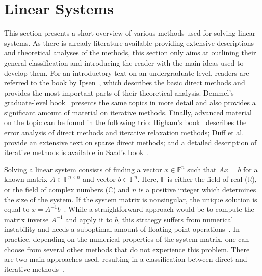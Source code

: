 \section{Linear Systems}

This section presents a short overview of various methods used for solving
linear systems. As there is already literature available providing extensive
descriptions and theoretical analyses of the methods, this section only aims at
outlining their general classification and introducing the reader with the main
ideas used to develop them. For an introductory text on an undergraduate level,
readers are referred to the book by Ipsen~\cite{Ipsen2009}, which describes the
basic direct methods and provides the most important parts of their theoretical
analysis. Demmel's graduate-level book~\cite{demmel} presents the same topics in
more detail and also provides a significant amount of material on iterative
methods. Finally, advanced material on the topic can be found in the following
trio: Higham's book~\cite{higham} describes the error analysis of direct methods
and iterative relaxation methods; Duff et al.~\cite{duff} provide an extensive
text on sparse direct methods; and a detailed description of iterative
methods is available in Saad's book~\cite{saad}.

Solving a linear system consists of finding a vector $x \in \mathbb{F}^n$ such
that $Ax = b$ for a known matrix $A \in \mathbb{F}^{n \times n}$ and vector $b
\in \mathbb{F}^n$. Here, $\mathbb{F}$ is either the field of real
($\mathbb{R}$), or the field of complex numbers ($\mathbb{C}$) and $n$ is a
positive integer which determines the size of the system. If the system matrix
is nonsingular, the unique solution is equal to $x = A^{-1}b$~\cite{demmel}.
While a straightforward approach would be to compute the matrix inverse $A^{-1}$
and apply it to $b$, this strategy suffers from numerical instability and
needs a suboptimal amount of floating-point
operations~\cite{demmel,Ipsen2009}. In practice, depending on the numerical
properties of the system matrix, one can choose from several
other methods that do not experience this problem. There are two main approaches
used, resulting in a classification between direct and iterative
methods~\cite{demmel}.

